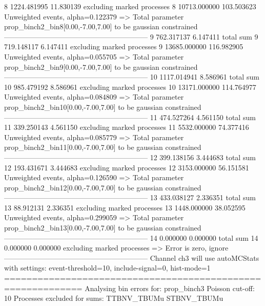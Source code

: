 8          1224.481995     11.830139       excluding marked processes    
8          10713.000000    103.503623      Unweighted events, alpha=0.122379
  => Total parameter prop_binch2_bin8[0.00,-7.00,7.00] to be gaussian constrained
------------------------------------------------------------
9          762.317137      6.147411        total sum                     
9          719.148117      6.147411        excluding marked processes    
9          13685.000000    116.982905      Unweighted events, alpha=0.055705
  => Total parameter prop_binch2_bin9[0.00,-7.00,7.00] to be gaussian constrained
------------------------------------------------------------
10         1117.014941     8.586961        total sum                     
10         985.479192      8.586961        excluding marked processes    
10         13171.000000    114.764977      Unweighted events, alpha=0.084809
  => Total parameter prop_binch2_bin10[0.00,-7.00,7.00] to be gaussian constrained
------------------------------------------------------------
11         474.527264      4.561150        total sum                     
11         339.250143      4.561150        excluding marked processes    
11         5532.000000     74.377416       Unweighted events, alpha=0.085779
  => Total parameter prop_binch2_bin11[0.00,-7.00,7.00] to be gaussian constrained
------------------------------------------------------------
12         399.138156      3.444683        total sum                     
12         193.431671      3.444683        excluding marked processes    
12         3153.000000     56.151581       Unweighted events, alpha=0.126590
  => Total parameter prop_binch2_bin12[0.00,-7.00,7.00] to be gaussian constrained
------------------------------------------------------------
13         433.038127      2.336351        total sum                     
13         88.912131       2.336351        excluding marked processes    
13         1448.000000     38.052595       Unweighted events, alpha=0.299059
  => Total parameter prop_binch2_bin13[0.00,-7.00,7.00] to be gaussian constrained
------------------------------------------------------------
14         0.000000        0.000000        total sum                     
14         0.000000        0.000000        excluding marked processes    
  => Error is zero, ignore      
------------------------------------------------------------
Channel ch3 will use autoMCStats with settings: event-threshold=10, include-signal=0, hist-mode=1
============================================================
Analysing bin errors for: prop_binch3
Poisson cut-off: 10
Processes excluded for sums: TTBNV_TBUMu STBNV_TBUMu
